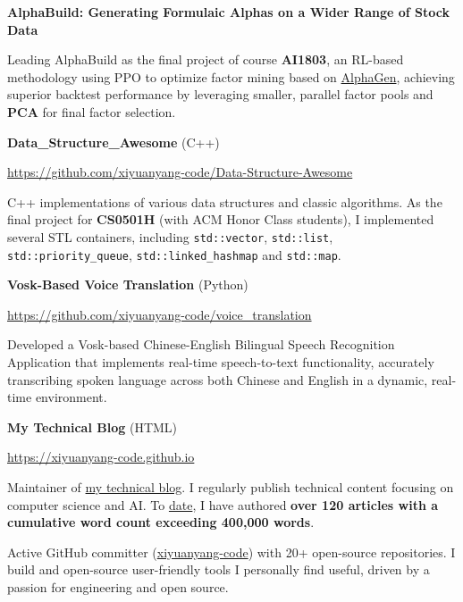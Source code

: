 \documentclass[letterpaper,11pt]{article}
\begin{document}
\textbf{AlphaBuild: Generating Formulaic Alphas on a Wider Range of Stock Data}

Leading AlphaBuild as the final project of course \textbf{AI1803}, an RL-based methodology using PPO to optimize factor mining based on \href{https://github.com/RL-MLDM/alphagen}{AlphaGen}, achieving superior backtest performance by leveraging smaller, parallel factor pools and \textbf{PCA} for final factor selection.
\newline

{\bfseries\selectfont Data\_Structure\_Awesome} (C++)

\url{https://github.com/xiyuanyang-code/Data-Structure-Awesome}

C++ implementations of various data structures and classic algorithms. As the final project for \textbf{CS0501H} (with ACM Honor Class students), I implemented several STL containers, including \texttt{std::vector}, \texttt{std::list}, \texttt{std::priority\_queue}, \texttt{std::linked\_hashmap} and \texttt{std::map}.
\newline



\textbf{Vosk-Based Voice Translation} (Python)

\url{https://github.com/xiyuanyang-code/voice_translation}

Developed a Vosk-based Chinese-English Bilingual Speech Recognition Application that implements real-time speech-to-text functionality, accurately transcribing spoken language across both Chinese and English in a dynamic, real-time environment.
\newline

\textbf{My Technical Blog} (HTML)

\url{https://xiyuanyang-code.github.io} 

Maintainer of \href{https://xiyuanyang-code.github.io}{my technical blog}. I regularly publish technical content focusing on computer science and AI. To \href{https://xiyuanyang-code.github.io/Blog-word-counting/}{date}, I have authored \textbf{over 120 articles with a cumulative word count exceeding 400,000 words}.
\newline

Active GitHub committer (\href{https://github.com/xiyuanyang-code}{xiyuanyang-code}) with 20+ open-source repositories. I build and open-source user-friendly tools I personally find useful, driven by a passion for engineering and open source.
\end{document}
